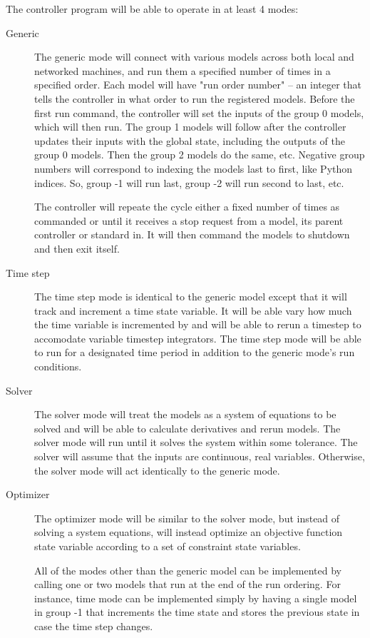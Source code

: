\documentclass{book}
\begin{document}
The controller program will be able to operate in at least 4 modes: 
\begin{description}
	\item[Generic] The generic mode will connect with various models across both local and networked machines, and run them a specified number of times in a specified order. Each model will have "run order number" -- an integer that tells the controller in what order to run the registered models. Before the first run command, the controller will set the inputs of the group 0 models, which will then run. The group 1 models will follow after the controller updates their inputs with the global state, including the outputs of the group 0 models. Then the group 2 models do the same, etc. Negative group numbers will correspond to indexing the models last to first, like Python indices. So, group -1 will run last, group -2 will run second to last, etc. 

The controller will repeate the cycle either a fixed number of times as commanded or until it receives a stop request from a model, its parent controller or standard in. It will then command the models to shutdown and then exit itself.
	\item[Time step] The time step mode is identical to the generic model except that it will track and increment a time state variable. It will be able vary how much the time variable is incremented by and will be able to rerun a timestep to accomodate variable timestep integrators. The time step mode will be able to run for a designated time period in addition to the generic mode's run conditions.
	\item[Solver] The solver mode will treat the models as a system of equations to be solved and will be able to calculate derivatives and rerun models. The solver mode will run until it solves the system within some tolerance. The solver will assume that the inputs are continuous, real variables. Otherwise, the solver mode will act identically to the generic mode.
	\item[Optimizer]  The optimizer mode will be similar to the solver mode, but instead of solving a system equations, will instead optimize an objective function state variable according to a set of constraint state variables.

All of the modes other than the generic model can be implemented by calling one or two models that run at the end of the run ordering. For instance, time mode can be implemented simply by having a single model in group -1 that increments the time state and stores the previous state in case the time step changes.
\end{description}
\end{document}
